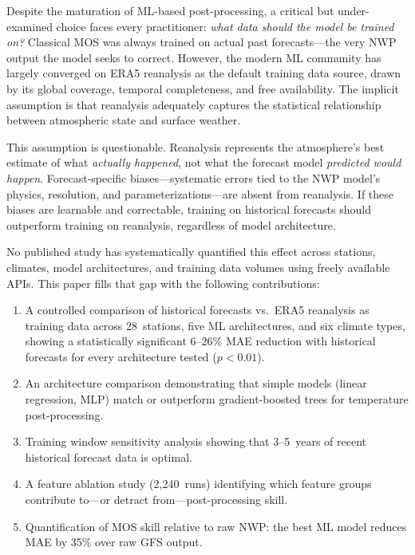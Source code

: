 \documentclass{ametsocV6.1}
\begin{document}
Despite the maturation of ML-based post-processing, a critical but under-examined
choice faces every practitioner: \emph{what data should the model be trained on?}
Classical MOS was always trained on actual past forecasts---the very NWP output the
model seeks to correct. However, the modern ML community has largely converged on
ERA5 reanalysis \citep{hersbach2020era5} as the default training data source, drawn
by its global coverage, temporal completeness, and free availability. The implicit
assumption is that reanalysis adequately captures the statistical relationship
between atmospheric state and surface weather.

This assumption is questionable. Reanalysis represents the atmosphere's best
estimate of what \emph{actually happened}, not what the forecast model
\emph{predicted would happen}. Forecast-specific biases---systematic errors tied to
the NWP model's physics, resolution, and parameterizations---are absent from
reanalysis. If these biases are learnable and correctable, training on historical
forecasts should outperform training on reanalysis, regardless of model architecture.

No published study has systematically quantified this effect across stations,
climates, model architectures, and training data volumes using freely available
APIs. This paper fills that gap with the following contributions:

\begin{enumerate}
  \item A controlled comparison of historical forecasts vs.\ ERA5 reanalysis as
    training data across 28~stations, five ML architectures, and six climate types,
    showing a statistically significant 6--26\% MAE reduction with historical
    forecasts for every architecture tested ($p < 0.01$).
  \item An architecture comparison demonstrating that simple models (linear
    regression, MLP) match or outperform gradient-boosted trees for temperature
    post-processing.
  \item Training window sensitivity analysis showing that 3--5~years of recent
    historical forecast data is optimal.
  \item A feature ablation study (2{,}240~runs) identifying which feature groups
    contribute to---or detract from---post-processing skill.
  \item Quantification of MOS skill relative to raw NWP: the best ML model
    reduces MAE by 35\% over raw GFS output.
\end{enumerate}
\end{document}
